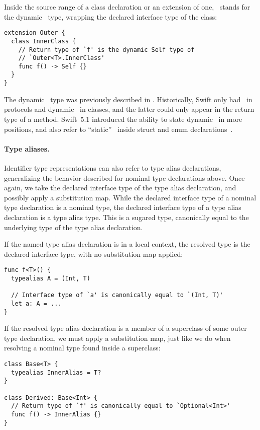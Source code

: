 \documentclass[../generics]{subfiles}
\begin{document}
Inside the source range of a class declaration or an extension of one, \tSelf\ stands for the dynamic \tSelf\ type, wrapping the declared interface type of the class:
\begin{Verbatim}
extension Outer {
  class InnerClass {
    // Return type of `f' is the dynamic Self type of
    // `Outer<T>.InnerClass'
    func f() -> Self {}
  }
}
\end{Verbatim}

The dynamic \tSelf\ type was previously described in . Historically, Swift only had \tSelf\ in protocols and dynamic \tSelf\ in classes, and the latter could only appear in the return type of a method. Swift~5.1 introduced the ability to state dynamic \tSelf\ in more positions, and also refer to ``static'' \tSelf\ inside struct and enum declarations~\cite{se0068}.

\paragraph{Type aliases.}
Identifier type representations can also refer to type alias declarations, generalizing the behavior described for nominal type declarations above. Once again, we take the declared interface type of the type alias declaration, and possibly apply a substitution map. While the declared interface type of a nominal type declaration is a nominal type, the declared interface type of a type alias declaration is a type alias type. This is a sugared type, canonically equal to the underlying type of the type alias declaration.

If the named type alias declaration is in a local context, the resolved type is the declared interface type, with no substitution map applied:
\begin{Verbatim}
func f<T>() {
  typealias A = (Int, T)

  // Interface type of `a' is canonically equal to `(Int, T)'
  let a: A = ...
}
\end{Verbatim}

If the resolved type alias declaration is a member of a superclass of some outer type declaration, we must apply a substitution map, just like we do when resolving a nominal type found inside a superclass:
\begin{Verbatim}
class Base<T> {
  typealias InnerAlias = T?
}

class Derived: Base<Int> {
  // Return type of `f' is canonically equal to `Optional<Int>'
  func f() -> InnerAlias {}
}
\end{Verbatim}
\end{document}
